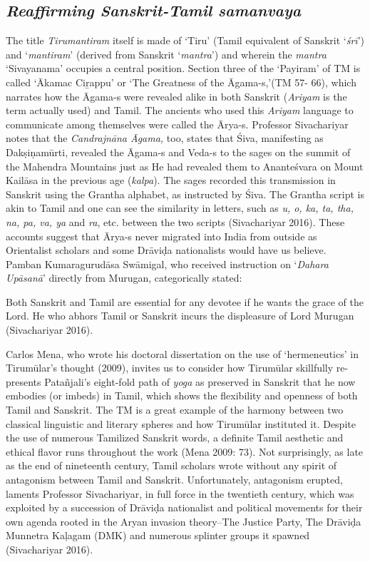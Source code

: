 \subsection*{\textit{Reaffirming Sanskrit-Tamil samanvaya}}

The title \textit{Tirumantiram} itself is made of ‘Tiru’ (Tamil equivalent of Sanskrit ‘\textit{śrī}’) and ‘\textit{mantiram}’ (derived from Sanskrit ‘\textit{mantra}’) and wherein the \textit{mantra} ‘Sivayanama’ occupies a central position. Section three of the ‘Payiram’ of TM is called ‘Ākamac Ciṟappu’ or ‘The Greatness of the Āgama-s,’(TM 57- 66), which narrates how the Āgama-s were revealed alike in both Sanskrit (\textit{Ariyam} is the term actually used) and Tamil. The ancients who used this \textit{Ariyam} language to communicate among themselves were called the Ārya-s. Professor Sivachariyar notes that the \textit{Candrajnāna Āgama,} too, states that Śiva, manifesting as Dakṣiṇamūrti, revealed the Āgama-s and Veda-s to the sages on the summit of the Mahendra Mountains just as He had revealed them to Ananteśvara on Mount Kailāsa in the previous age (\textit{kalpa}). The sages recorded this transmission in Sanskrit using the Grantha alphabet, as instructed by Śiva. The Grantha script is akin to Tamil and one can see the similarity in letters, such as \textit{u, o, ka, ta, tha, na, pa, va, ya} and \textit{ra}, etc. between the two scripts (Sivachariyar 2016). These accounts suggest that Ārya-s never migrated into India from outside as Orientalist scholars and some Drāviḍa nationalists would have us believe. Pamban Kumaragurudāsa Swāmigal, who received instruction on ‘\textit{Dahara Upāsanā}’ directly from Murugan, categorically stated:

\begin{myquote}
Both Sanskrit and Tamil are essential for any devotee if he wants the grace of the Lord. He who abhors Tamil or Sanskrit incurs the displeasure of Lord Murugan (Sivachariyar 2016).
\end{myquote}

Carlos Mena, who wrote his doctoral dissertation on the use of ‘hermeneutics’ in Tirumūlar’s thought (2009), invites us to consider how Tirumūlar skillfully re-presents Patañjali’s eight-fold path of \textit{yoga} as preserved in Sanskrit that he now embodies (or imbeds) in Tamil, which shows the flexibility and openness of both Tamil and Sanskrit. The TM is a great example of the harmony between two classical linguistic and literary spheres and how Tirumūlar instituted it. Despite the use of numerous Tamilized Sanskrit words, a definite Tamil aesthetic and ethical flavor runs throughout the work (Mena 2009: 73). Not surprisingly, as late as the end of nineteenth century, Tamil scholars wrote without any spirit of antagonism between Tamil and Sanskrit. Unfortunately, antagonism erupted, laments Professor Sivachariyar, in full force in the twentieth century, which was exploited by a succession of Drāviḍa nationalist and political movements for their own agenda rooted in the Aryan invasion theory--The Justice Party, The Drāviḍa Munnetra Kaļagam (DMK) and numerous splinter groups it spawned (Sivachariyar 2016).


